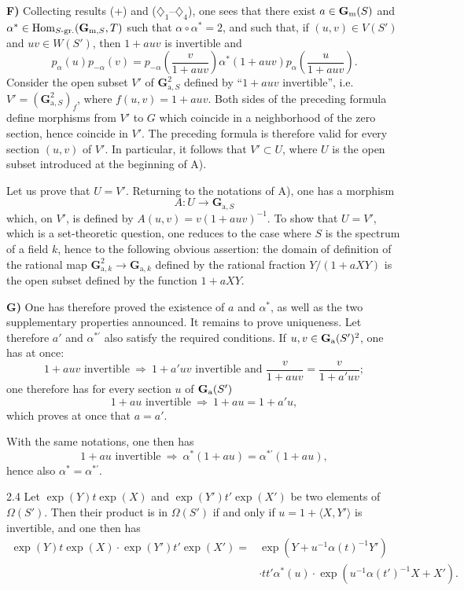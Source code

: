 \textbf{F)} {\renewcommand{\thefootnote}{(22)}}%
Collecting results (+) and ($\diamondsuit_1$--$\diamondsuit_4$), one sees that there exist $a\in\mathbf{G}_{\mathrm{m}}(S)$ and $\alpha^*\in\operatorname{Hom}_{S\text{-gr.}}(\mathbf G_{\mathrm m,S},T)$ such that $\alpha\circ\alpha^*=2$, and such that, if $(u,v)\in V(S')$ and $uv\in W(S')$, then $1+auv$ is invertible and
\[
p_\alpha(u)p_{-\alpha}(v)=p_{-\alpha}\left(\frac{v}{1+auv}\right)\alpha^*(1+auv)p_\alpha\left(\frac{u}{1+auv}\right).
\]
Consider the open subset $V'$ of $\mathbf G_{\mathrm a,S}^2$ defined by ``$1+auv$ invertible'', i.e. $V'=(\mathbf G_{\mathrm a,S}^2)_f$, where $f(u,v)=1+auv$. Both sides of the preceding formula define morphisms from $V'$ to $G$ which coincide in a neighborhood of the zero section, hence coincide in $V'$. The preceding formula is therefore valid for every section $(u,v)$ of $V'$. In particular, it follows that $V'\subset U$, where $U$ is the open subset introduced at the beginning of A).

Let us prove that $U=V'$. Returning to the notations of A), one has a morphism
\[
A:U\to\mathbf G_{\mathrm a,S}
\]
which, on $V'$, is defined by $A(u,v)=v(1+auv)^{-1}$. To show that $U=V'$, which is a set-theoretic question, one reduces to the case where $S$ is the spectrum of a field $k$, hence to the following obvious assertion: the domain of definition of the rational map $\mathbf G_{\mathrm a,k}^2\to\mathbf G_{\mathrm a,k}$ defined by the rational fraction $Y/(1+aXY)$ is the open subset defined by the function $1+aXY$.

\textbf{G)} One has therefore proved the existence of $a$ and $\alpha^*$, as well as the two supplementary properties announced. It remains to prove uniqueness. Let therefore $a'$ and $\alpha^{*'}$ also satisfy the required conditions. If $u,v\in\mathbf{G}_{\mathrm{a}}(S')^2$, one has at once:
\[
1+auv\text{ invertible}\ \Rightarrow\ 1+a'uv\text{ invertible and }\frac{v}{1+auv}=\frac{v}{1+a'uv};
\]
one therefore has for every section $u$ of $\mathbf{G}_{\mathrm{a}}(S')$
\[
1+au\text{ invertible}\ \Longrightarrow\ 1+au=1+a'u,
\]
which proves at once that $a=a'$.

With the same notations, one then has
\[
1+au\text{ invertible}\ \Longrightarrow\ \alpha^*(1+au)=\alpha^{*'}(1+au),
\]
hence also $\alpha^*=\alpha^{*'}$.

\begin{corollary}{2.4}\label{XX.2.4}
Let $\exp(Y)t\exp(X)$ and $\exp(Y')t'\exp(X')$ be two elements of $\Omega(S')$. Then their product is in $\Omega(S')$ if and only if $u=1+\langle X,Y'\rangle$ is invertible, and one then has
\begin{equation}\tag{$F'$}\label{XX.eq.Fprime}
\begin{split}
\exp(Y)t\exp(X)\cdot\exp(Y')t'\exp(X')={}&\exp(Y+u^{-1}\alpha(t)^{-1}Y')\\
&\cdot tt'\alpha^*(u)\cdot\exp(u^{-1}\alpha(t')^{-1}X+X').
\end{split}
\end{equation}
\end{corollary}

